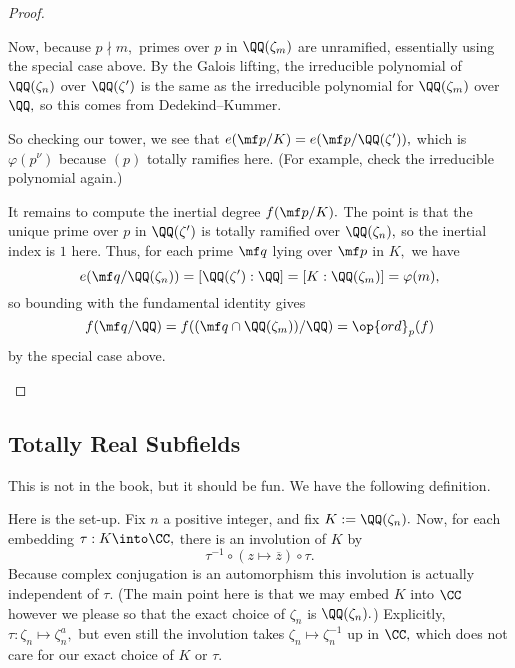 \begin{proof}
\begin{itemize}
		Now, because $p\nmid m,$ primes over $p$ in $\QQ(\zeta_m)$ are unramified, essentially using the special case above. By the Galois lifting, the irreducible polynomial of $\QQ(\zeta_n)$ over $\QQ(\zeta')$ is the same as the irreducible polynomial for $\QQ(\zeta_m)$ over $\QQ,$ so this comes from Dedekind--Kummer.

		So checking our tower, we see that $e(\mf p/K)=e(\mf p/\QQ(\zeta')),$ which is $\varphi\left(p^\nu\right)$ because $(p)$ totally ramifies here. (For example, check the irreducible polynomial again.)

		It remains to compute the inertial degree $f(\mf p/K).$ The point is that the unique prime over $p$ in $\QQ(\zeta')$ is totally ramified over $\QQ(\zeta_n),$ so the inertial index is $1$ here. Thus, for each prime $\mf q$ lying over $\mf p$ in $K,$ we have
		\[e(\mf q/\QQ(\zeta_n))=[\QQ(\zeta'):\QQ]=[K:\QQ(\zeta_m)]=\varphi(m),\]
		so bounding with the fundamental identity\todo{} gives
		\[f(\mf q/\QQ)=f((\mf q\cap\QQ(\zeta_m))/\QQ)=\op{ord}_p(f)\]
		by the special case above. 
		\qedhere
	\end{itemize}
\end{proof}

\subsection{Totally Real Subfields}
This is not in the book, but it should be fun. We have the following definition.

Here is the set-up. Fix $n$ a positive integer, and fix $K:=\QQ(\zeta_n).$ Now, for each embedding $\tau:K\into\CC,$ there is an involution of $K$ by
\[\tau^{-1}\circ(z\mapsto\overline z)\circ\tau.\]
Because complex conjugation is an automorphism this involution is actually independent of $\tau.$ (The main point here is that we may embed $K$ into $\CC$ however we please so that the exact choice of $\zeta_n$ is $\QQ(\zeta_n).$) Explicitly, $\tau:\zeta_n\mapsto\zeta_n^a,$ but even still the involution takes $\zeta_n\mapsto\zeta_n^{-1}$ up in $\CC,$ which does not care for our exact choice of $K$ or $\tau.$

